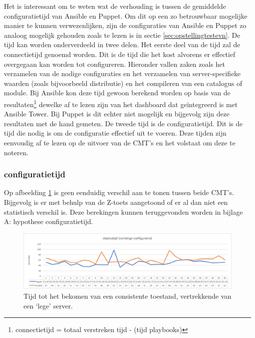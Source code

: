 Het is interessant om te weten wat de verhouding is tussen de gemiddelde \gls{configuratietijd} van Ansible en Puppet. Om dit op een zo betrouwbaar mogelijke manier te kunnen verwezenlijken, zijn de configuraties van Ansible en Puppet zo analoog mogelijk gehouden zoals te lezen is in sectie \ref{sec:opstellingtestevn}. De tijd kan worden onderverdeeld in twee delen.\newline
Het eerste deel van de tijd zal de \gls{connectietijd} genoemd worden. Dit is de tijd die het kost alvorens er effectief overgegaan kan worden tot configureren. Hieronder vallen zaken zoals het verzamelen van de nodige configuraties en het verzamelen van server-specifieke waarden (zoals bijvoorbeeld distributie) en het compileren van een catalogus of module. Bij Ansible kon deze tijd gewoon berekend worden op basis van de resultaten\footnote{connectietijd = totaal verstreken tijd -  \unexpanded{$ \sum  $} (tijd playbooks)} dewelke af te lezen zijn van het dashboard dat ge\"integreerd is met Ansible Tower. Bij Puppet is dit echter niet mogelijk en bijgevolg zijn deze resultaten met de hand gemeten.\newline
 De tweede tijd is de \gls{configuratietijd}. Dit is de tijd die nodig is om de configuratie effectief uit te voeren. Deze tijden zijn eenvoudig af te lezen op de uitvoer van de \gls{CMT}'s en het volstaat om deze te noteren.




\subsubsection{\gls{configuratietijd}}

Op afbeelding \ref{fig:deploytime_fullconfig} is geen eenduidig verschil aan te tonen tussen beide \gls{CMT}'s. Bijgevolg is er met behulp van de Z-toets aangetoond of er al dan niet een statistisch verschil is. Deze berekingen kunnen teruggevonden worden in bijlage A: hypothese configuratietijd.

\begin{figure}
	\includegraphics[width=\linewidth]{img/deploytime_fullconfig.png} 
	\caption{Tijd tot het bekomen van een consistente toestand, vertrekkende van een ‘lege' server.}  
	\label{fig:deploytime_fullconfig}
\end{figure}


